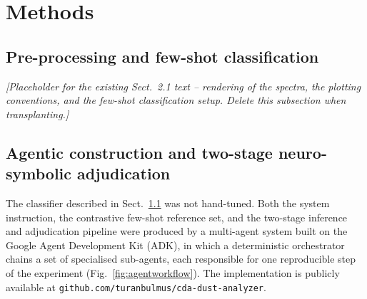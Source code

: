 \documentclass[twocolumn,a4paper,10pt]{article}
\begin{document}
\section{Methods}
\label{sec:methods}

\subsection{Pre-processing and few-shot classification}
\label{sec:classification}

\textit{[Placeholder for the existing Sect.~2.1 text -- rendering of the
spectra, the plotting conventions, and the few-shot classification setup.
Delete this subsection when transplanting.]}


\subsection{Agentic construction and two-stage neuro-symbolic adjudication}
\label{sec:agentic}

The classifier described in Sect.~\ref{sec:classification} was not hand-tuned.
Both the system instruction, the contrastive few-shot reference set, and the
two-stage inference and adjudication pipeline were produced by a multi-agent
system built on the Google Agent Development Kit (ADK), in which a
deterministic orchestrator chains a set of specialised sub-agents, each
responsible for one reproducible step of the experiment
(Fig.~\ref{fig:agentworkflow}). The implementation is publicly available at
\texttt{github.com/turanbulmus/cda-dust-analyzer}.
\end{document}
